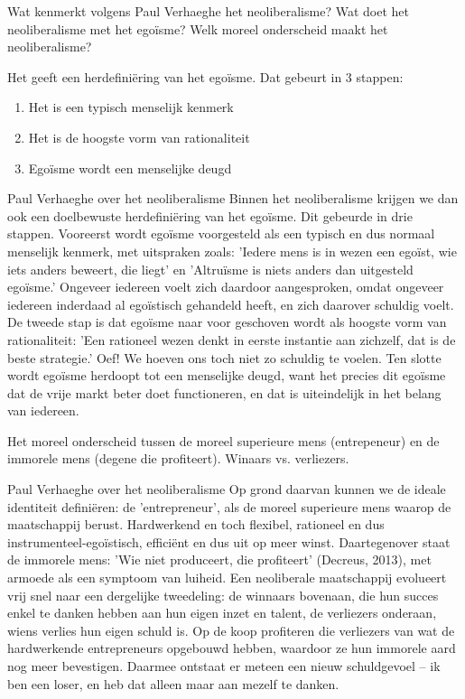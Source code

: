 \documentclass[main.tex]{subfiles}
\begin{document}
\begin{examenvraag}
    \begin{vraag}
        Wat kenmerkt volgens Paul Verhaeghe het neoliberalisme? Wat doet het 
        neoliberalisme met het egoïsme? Welk moreel onderscheid maakt het 
        neoliberalisme?
    \end{vraag}

    \begin{antwoord}
    Het geeft een herdefiniëring van het ego\"isme. Dat gebeurt in 3 stappen:
    \begin{enumerate}
    	\item Het is een typisch menselijk kenmerk
    	\item Het is de hoogste vorm van rationaliteit
    	\item Egoïsme wordt een menselijke deugd
    \end{enumerate}
    
    \begin{citaat}{Paul Verhaeghe over het neoliberalisme}
Binnen het neoliberalisme krijgen we dan ook een doelbewuste herdefiniëring
van het egoïsme. Dit gebeurde in drie stappen. Vooreerst wordt egoïsme voorgesteld als een typisch en
dus normaal menselijk kenmerk, met uitspraken zoals: 'Iedere mens is in wezen een egoïst, wie iets
anders beweert, die liegt' en 'Altruïsme is niets anders dan uitgesteld egoïsme.' Ongeveer iedereen
voelt zich daardoor aangesproken, omdat ongeveer iedereen inderdaad al egoïstisch gehandeld heeft,
en zich daarover schuldig voelt. De tweede stap is dat egoïsme naar voor geschoven wordt als hoogste
vorm van rationaliteit: 'Een rationeel wezen denkt in eerste instantie aan zichzelf, dat is de beste
strategie.' Oef! We hoeven ons toch niet zo schuldig te voelen. Ten slotte wordt egoïsme herdoopt tot
een menselijke deugd, want het precies dit egoïsme dat de vrije markt beter doet functioneren, en dat is
uiteindelijk in het belang van iedereen.
    \end{citaat}
    Het moreel onderscheid tussen de moreel superieure mens (entrepeneur) en de immorele mens (degene die profiteert). Winaars vs. verliezers.
        \begin{citaat}{Paul Verhaeghe over het neoliberalisme}
Op grond daarvan kunnen we de ideale identiteit definiëren: de 'entrepreneur', als de moreel
superieure mens waarop de maatschappij berust. Hardwerkend en toch flexibel, rationeel en dus
instrumenteel-egoïstisch, efficiënt en dus uit op meer winst. Daartegenover staat de immorele mens:
'Wie niet produceert, die profiteert' (Decreus, 2013), met armoede als een symptoom van luiheid. Een
neoliberale maatschappij evolueert vrij snel naar een dergelijke tweedeling: de winnaars bovenaan, die
hun succes enkel te danken hebben aan hun eigen inzet en talent, de verliezers onderaan, wiens verlies
hun eigen schuld is. Op de koop profiteren die verliezers van wat de hardwerkende entrepreneurs
opgebouwd hebben, waardoor ze hun immorele aard nog meer bevestigen. Daarmee ontstaat er meteen
een nieuw schuldgevoel – ik ben een loser, en heb dat alleen maar aan mezelf te danken.
    \end{citaat}
    \end{antwoord}
\end{examenvraag}
\end{document}

